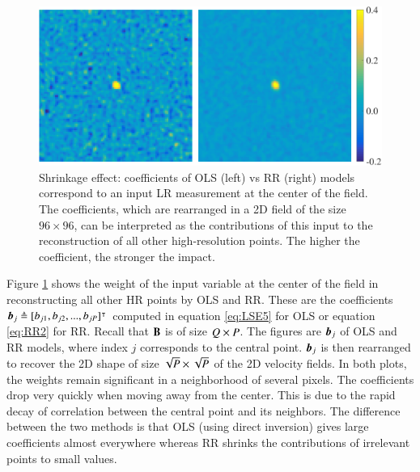 \begin{figure}
\centering
	\includegraphics[width=0.8\columnwidth]{./images/regression/RR_LSE_coefficients.png}
	\caption{\label{fig:RR_LSE_coefficients} Shrinkage effect: coefficients of OLS (left) vs RR (right) models correspond to an input LR measurement at the center of the field. The coefficients, which are rearranged in a 2D field of the size $ 96 \times 96 $, can be interpreted as the contributions of this input to the reconstruction of all other high-resolution points. The higher the coefficient, the stronger the impact.}
\end{figure}

Figure \ref{fig:RR_LSE_coefficients} shows the weight of the input variable at the center of the field in reconstructing all other HR points by OLS and RR. These are the coefficients $ \operatorname{\boldsymbol{b}}_j \triangleq [b_{j1}, b_{j2}, ..., b_{jP}]^{\intercal}$ computed in equation \ref{eq:LSE5} for OLS or equation \ref{eq:RR2} for RR. Recall that $ \mathbf{B} $ is of size $ Q \times P $. The figures are $ \operatorname{\boldsymbol{b}}_j$ of OLS and RR models, where index $ j $ corresponds to the central point. $ \operatorname{\boldsymbol{b}}_j $ is then rearranged to recover the 2D shape of size $ \sqrt{P} \times \sqrt{P} $ of the 2D velocity fields. In both plots, the weights remain significant in a neighborhood of several pixels. The coefficients drop very quickly when moving away from the center. This is due to the rapid decay of correlation between the central point and its neighbors. The difference between the two methods is that OLS (using direct inversion) gives large coefficients almost everywhere whereas RR shrinks the contributions of irrelevant points to small values.

